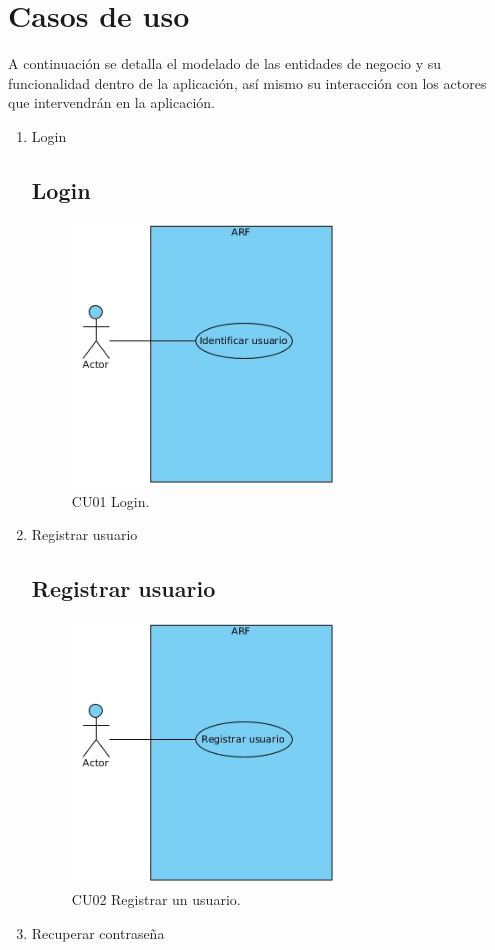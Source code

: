 \section{Casos de uso}
A continuación se detalla el modelado de las entidades de negocio y su funcionalidad dentro de la aplicación, así mismo su interacción con los actores que intervendrán en la aplicación.\par
\vspace{5mm}
\begin{enumerate}[1.]
\item Login

\subsection{Login}
\begin{figure}[h!]
	\centering
	\includegraphics[width=7cm,height=7cm]{imagenes/analisis/login.jpg}
	\caption{CU01 Login.\cite{B27}}
	\label{fig:analogo}
\end{figure}  
\newpage
\item Registrar usuario
\subsection{Registrar usuario} 
\begin{figure}[h!]
	\centering
	\includegraphics[width=7cm,height=7cm]{imagenes/analisis/registrarUsuario.jpg}
	\caption{CU02 Registrar un usuario.\cite{B27}}
	\label{fig:analogo}
\end{figure} 
\item Recuperar contraseña

\end{enumerate}

